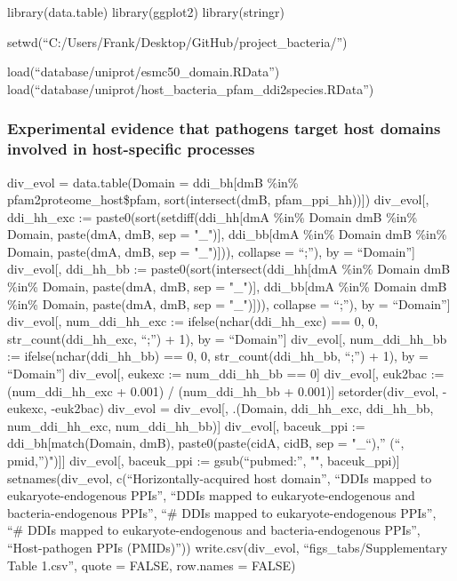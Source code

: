 \documentclass[
]{article}
\author{}
\date{\vspace{-2.5em}}
\begin{document}
library(data.table) library(ggplot2) library(stringr)

setwd(``C:/Users/Frank/Desktop/GitHub/project\_bacteria/'')

load(``database/uniprot/esmc50\_domain.RData'')
load(``database/uniprot/host\_bacteria\_pfam\_ddi2species.RData'')

\hypertarget{experimental-evidence-that-pathogens-target-host-domains-involved-in-host-specific-processes}{%
\subsubsection{Experimental evidence that pathogens target host domains
involved in host-specific
processes}\label{experimental-evidence-that-pathogens-target-host-domains-involved-in-host-specific-processes}}

div\_evol = data.table(Domain = ddi\_bh{[}dmB \%in\%
pfam2proteome\_host\$pfam, sort(intersect(dmB, pfam\_ppi\_hh)){]})
div\_evol{[}, ddi\_hh\_exc := paste0(sort(setdiff(ddi\_hh{[}dmA \%in\%
Domain \textbar{} dmB \%in\% Domain, paste(dmA, dmB, sep = "\_"){]},
ddi\_bb{[}dmA \%in\% Domain \textbar{} dmB \%in\% Domain, paste(dmA,
dmB, sep = "\_"){]})), collapse = ``;''), by = ``Domain''{]}
div\_evol{[}, ddi\_hh\_bb := paste0(sort(intersect(ddi\_hh{[}dmA \%in\%
Domain \textbar{} dmB \%in\% Domain, paste(dmA, dmB, sep = "\_"){]},
ddi\_bb{[}dmA \%in\% Domain \textbar{} dmB \%in\% Domain, paste(dmA,
dmB, sep = "\_"){]})), collapse = ``;''), by = ``Domain''{]}
div\_evol{[}, num\_ddi\_hh\_exc := ifelse(nchar(ddi\_hh\_exc) == 0, 0,
str\_count(ddi\_hh\_exc, ``;'') + 1), by = ``Domain''{]} div\_evol{[},
num\_ddi\_hh\_bb := ifelse(nchar(ddi\_hh\_bb) == 0, 0,
str\_count(ddi\_hh\_bb, ``;'') + 1), by = ``Domain''{]} div\_evol{[},
eukexc := num\_ddi\_hh\_bb == 0{]} div\_evol{[}, euk2bac :=
(num\_ddi\_hh\_exc + 0.001) / (num\_ddi\_hh\_bb + 0.001){]}
setorder(div\_evol, -eukexc, -euk2bac) div\_evol = div\_evol{[},
.(Domain, ddi\_hh\_exc, ddi\_hh\_bb, num\_ddi\_hh\_exc,
num\_ddi\_hh\_bb){]} div\_evol{[}, baceuk\_ppi :=
ddi\_bh{[}match(Domain, dmB), paste0(paste(cidA, cidB, sep = "\_``),''
(``, pmid,'')"){]}{]} div\_evol{[}, baceuk\_ppi := gsub(``pubmed:'', "",
baceuk\_ppi){]} setnames(div\_evol, c(``Horizontally-acquired host
domain'', ``DDIs mapped to eukaryote-endogenous PPIs'', ``DDIs mapped to
eukaryote-endogenous and bacteria-endogenous PPIs'', ``\# DDIs mapped to
eukaryote-endogenous PPIs'', ``\# DDIs mapped to eukaryote-endogenous
and bacteria-endogenous PPIs'', ``Host-pathogen PPIs (PMIDs)''))
write.csv(div\_evol, ``figs\_tabs/Supplementary Table 1.csv'', quote =
FALSE, row.names = FALSE)
\end{document}
